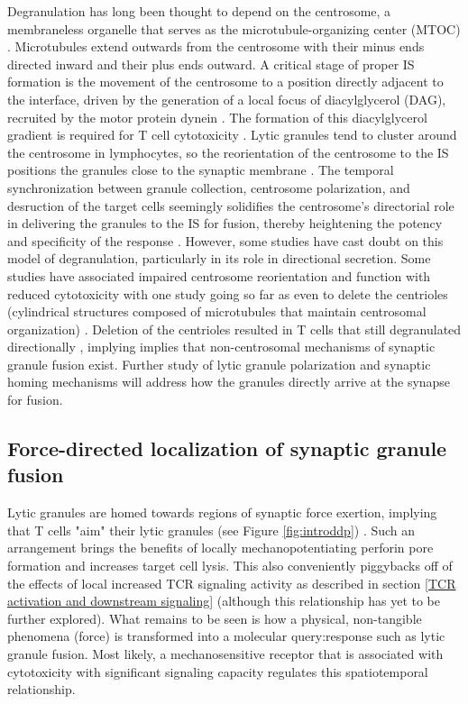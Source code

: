 Degranulation has long been thought to depend on the centrosome, a membraneless organelle that serves as the microtubule-organizing center (MTOC)  \cite{Bettencourt-Dias2007, Pihan2013}. Microtubules extend outwards from the centrosome with their minus ends directed inward and their plus ends outward. A critical stage of proper IS formation is the movement of the centrosome to a position directly adjacent to the interface, driven by the generation of a local focus of diacylglycerol (DAG), recruited by the motor protein dynein \cite{Quann2009}. The formation of this diacylglycerol gradient is required for T cell cytotoxicity \cite{Quann2009}. Lytic granules tend to cluster around the centrosome in lymphocytes, so the reorientation of the centrosome to the IS positions the granules close to the synaptic membrane \cite{Stinchcombe2007}. The temporal synchronization between granule collection, centrosome polarization,  and desruction of the target cells seemingly solidifies the centrosome's directorial role in delivering the granules to the IS for fusion, thereby heightening the potency and specificity of the response \cite{Stinchcombe2007}. However, some studies have cast doubt on this model of degranulation, particularly in its role in directional secretion. Some studies have associated impaired centrosome reorientation and function with reduced cytotoxicity \cite{Quann2009, Tsun2011, DeLaRoche2013, Jenkins2014} with one study going so far as even to delete the centrioles (cylindrical structures composed of microtubules that maintain centrosomal organization) \cite{Tamzalit2020}. Deletion of the centrioles resulted in T cells that still degranulated directionally \cite{Tamzalit2020}, implying implies that non-centrosomal mechanisms of synaptic granule fusion exist. Further study of lytic granule polarization and synaptic homing mechanisms will address how the granules directly arrive at the synapse for fusion.

\subsection{Force-directed localization of synaptic granule fusion}
\label{Force-directed localization of synaptic granule fusion}
Lytic granules are homed towards regions of synaptic force exertion, implying that T cells "aim" their lytic granules (see Figure \ref{fig:introddp}) \cite{Basu2016}. Such an arrangement brings the benefits of locally mechanopotentiating perforin pore formation and increases target cell lysis. This also conveniently piggybacks off of the effects of local increased TCR signaling activity as described in section \ref{TCR activation and downstream signaling} (although this relationship has yet to be further explored). What remains to be seen is how a physical, non-tangible phenomena (force) is transformed into a molecular query:response such as lytic granule fusion. Most likely, a mechanosensitive receptor that is associated with cytotoxicity with significant signaling capacity regulates this spatiotemporal relationship. 


